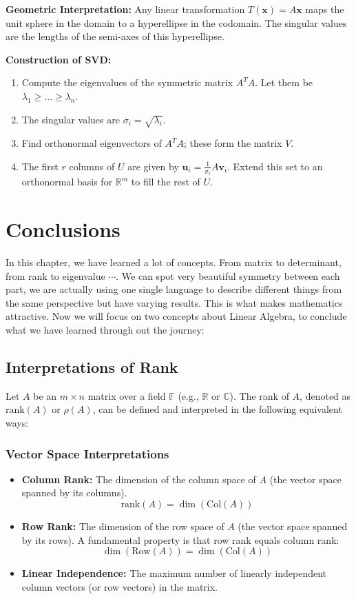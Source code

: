 \textbf{Geometric Interpretation:}
Any linear transformation $T(\mathbf{x}) = A\mathbf{x}$ maps the unit sphere in the domain to a hyperellipse in the codomain. The singular values are the lengths of the semi-axes of this hyperellipse.

\textbf{Construction of SVD:}
\begin{enumerate}
    \item Compute the eigenvalues of the symmetric matrix $A^T A$. Let them be $\lambda_1 \ge \dots \ge \lambda_n$.
    \item The singular values are $\sigma_i = \sqrt{\lambda_i}$.
    \item Find orthonormal eigenvectors of $A^T A$; these form the matrix $V$.
    \item The first $r$ columns of $U$ are given by $\mathbf{u}_i = \frac{1}{\sigma_i} A \mathbf{v}_i$. Extend this set to an orthonormal basis for $\mathbb{R}^m$ to fill the rest of $U$.
\end{enumerate}

\section{Conclusions}

In this chapter, we have learned a lot of concepts. From matrix to determinant, from rank to eigenvalue $\cdots$. We can spot very beautiful symmetry between each part, we are actually using one single language to describe different things from the same perspective but have varying results. This is what makes mathematics attractive. Now we will focus on two concepts about Linear Algebra, to conclude what we have learned through out the journey:

\subsection{Interpretations of Rank}

Let $A$ be an $m \times n$ matrix over a field $\mathbb{F}$ (e.g., $\mathbb{R}$ or $\mathbb{C}$). The rank of $A$, denoted as $\text{rank}(A)$ or $\rho(A)$, can be defined and interpreted in the following equivalent ways:

\subsubsection{Vector Space Interpretations}
\begin{itemize}
    \item \textbf{Column Rank:} The dimension of the column space of $A$ (the vector space spanned by its columns).
    \[ \text{rank}(A) = \dim(\text{Col}(A)) \]
    \item \textbf{Row Rank:} The dimension of the row space of $A$ (the vector space spanned by its rows). A fundamental property is that row rank equals column rank:
    \[ \dim(\text{Row}(A)) = \dim(\text{Col}(A)) \]
    \item \textbf{Linear Independence:} The maximum number of linearly independent column vectors (or row vectors) in the matrix.
\end{itemize}

